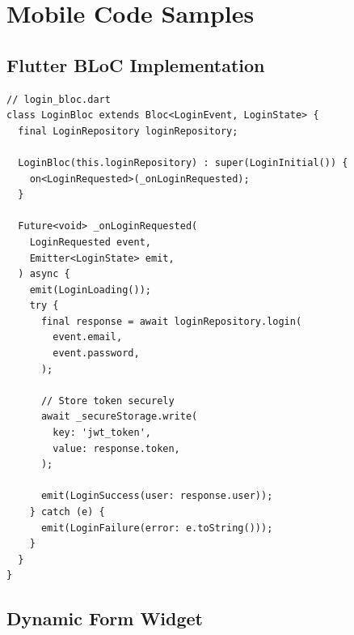 \section{Mobile Code Samples}

\subsection{Flutter BLoC Implementation}

\begin{lstlisting}
// login_bloc.dart
class LoginBloc extends Bloc<LoginEvent, LoginState> {
  final LoginRepository loginRepository;

  LoginBloc(this.loginRepository) : super(LoginInitial()) {
    on<LoginRequested>(_onLoginRequested);
  }

  Future<void> _onLoginRequested(
    LoginRequested event,
    Emitter<LoginState> emit,
  ) async {
    emit(LoginLoading());
    try {
      final response = await loginRepository.login(
        event.email,
        event.password,
      );

      // Store token securely
      await _secureStorage.write(
        key: 'jwt_token',
        value: response.token,
      );

      emit(LoginSuccess(user: response.user));
    } catch (e) {
      emit(LoginFailure(error: e.toString()));
    }
  }
}
\end{lstlisting}

\subsection{Dynamic Form Widget}

